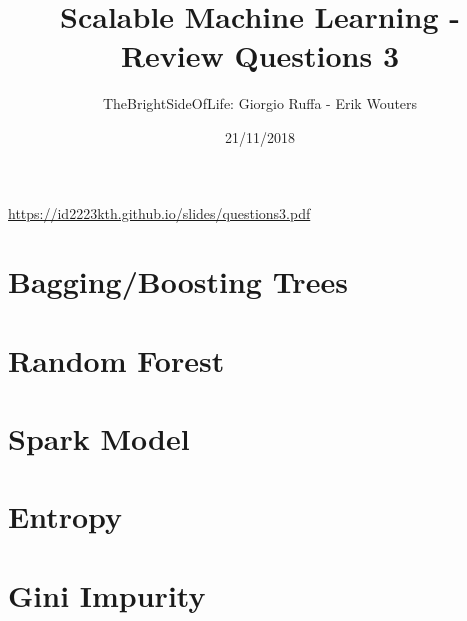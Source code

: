 \documentclass[a4paper]{article}
\title{Scalable Machine Learning - Review Questions 3}
\author{TheBrightSideOfLife: Giorgio Ruffa - Erik Wouters}
\date{21/11/2018}
\begin{document}
\maketitle

\url{https://id2223kth.github.io/slides/questions3.pdf}

\section{Bagging/Boosting Trees}

\section{Random Forest}

\section{Spark Model}

\section{Entropy}

\section{Gini Impurity}
\end{document}
